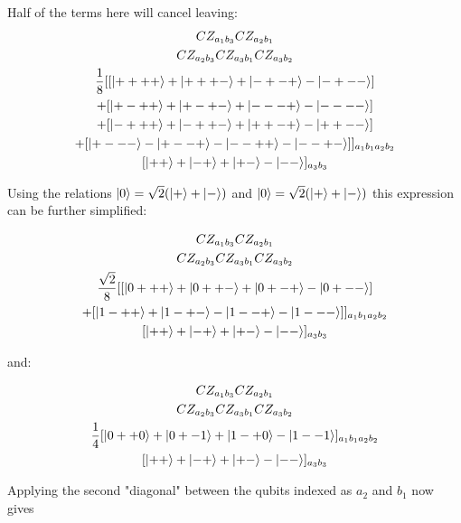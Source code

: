 Half of the terms here will cancel leaving:
\begin{multline*}
CZ _{a_{1} b_{3}} CZ _{a_{2} b_{1}} \\
CZ _{a_{2} b_{3}} CZ _{a_{3} b_{1}} CZ _{a_{3} b_{2}} \\
\frac{1}{8}
[[\ket{+ + + +} + \ket{+ + + -} + \ket{- + - +} - \ket{- + - -}] \\
+[\ket{+ - + +} + \ket{+ - + -} + \ket{- - - +} - \ket{- - - -}] \\
+[\ket{- + + +} + \ket{- + + -} + \ket{+ + - +} - \ket{+ + - -}] \\
+[\ket{+ - - -} - \ket{+ - - +} - \ket{- - + +} - \ket{- - + -}]] _{a_{1} b_{1} a_{2} b_{2}} \\
[ \ket{+ +} + \ket{- +} + \ket{+ -} - \ket{- -} ] _{a_{3} b_{3}} \\
\end{multline*}

Using the relations $\ket{0} = \sqrt{2} (\ket{+} + \ket{-})$ and $\ket{0} = \sqrt{2} (\ket{+} + \ket{-})$ this expression can be further simplified:

\begin{multline*}
CZ _{a_{1} b_{3}} CZ _{a_{2} b_{1}} \\
CZ _{a_{2} b_{3}} CZ _{a_{3} b_{1}} CZ _{a_{3} b_{2}} \\
\frac{\sqrt{2}}{8}
[[\ket{0 + + +} + \ket{0 + + -} + \ket{0 + - +} - \ket{0 + - -}] \\
+[\ket{1 - + +} + \ket{1 - + -} - \ket{1 - - +} - \ket{1 - - -}]] _{a_{1} b_{1} a_{2} b_{2}} \\
[ \ket{+ +} + \ket{- +} + \ket{+ -} - \ket{- -} ] _{a_{3} b_{3}} \\
\end{multline*}

and:
 
\begin{multline*}
CZ _{a_{1} b_{3}} CZ _{a_{2} b_{1}} \\
CZ _{a_{2} b_{3}} CZ _{a_{3} b_{1}} CZ _{a_{3} b_{2}} \\
\frac{1}{4}
[\ket{0 + + 0} + \ket{0 + - 1} + \ket{1 - + 0} - \ket{1 - - 1}] _{a_{1} b_{1} a_{2} b_{2}} \\
[ \ket{+ +} + \ket{- +} + \ket{+ -} - \ket{- -} ] _{a_{3} b_{3}} \\
\end{multline*}

Applying the second "diagonal" between the qubits indexed as $a_{2}$ and $b_{1}$ now gives

